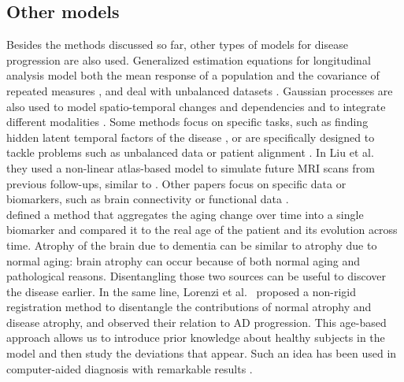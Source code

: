 \subsection{Other models}

Besides the methods discussed so far, other types of models for disease progression are also used.  Generalized estimation equations for longitudinal analysis \cite{liang1986longitudinal} model both the mean response of a population and the covariance of repeated measures \cite{Zhang2014}, and deal with unbalanced datasets \cite{Guillaume2014,Li2013}. Gaussian processes are also used to model spatio-temporal changes and dependencies \cite{Hyun2016,Lorenzi2015b,Lorenzi2015c} and to integrate different modalities \cite{Lorenzi2017}. Some methods focus on specific tasks, such as finding hidden latent temporal factors of the disease \cite{Chen2012,Wachinger2017}, or are specifically designed to tackle problems such as unbalanced data or patient alignment \cite{Bilgel2018,Dawson2016,Goyal2018,Li2013}. In Liu et al.\ \cite{Liu2015} they used a non-linear atlas-based model to simulate future MRI scans from previous follow-ups, similar to \cite{Lorenzi2015c}. Other papers focus on specific data or biomarkers, such as brain connectivity \cite{Chenhui2014} or functional data \cite{Li2017b}.  \\

\cite{Franke2010,Franke2012,Gaser2013} defined a method that aggregates the aging change over time into a single biomarker and compared it to the real age of the patient and its evolution across time. Atrophy of the brain due to dementia can be similar to atrophy due to normal aging: brain atrophy can occur because of both normal aging and pathological reasons. Disentangling those two sources can be useful to discover the disease earlier. In the same line, Lorenzi et al.\ \cite{Lorenzi2014} proposed a non-rigid registration method to disentangle the contributions of normal atrophy and disease atrophy, and observed their relation to AD progression. This age-based approach allows us to introduce prior knowledge about healthy subjects in the model and then study the deviations that appear. Such an idea has been used in computer-aided diagnosis with remarkable results \cite{Gavidia-Bovadilla2017}. \\

